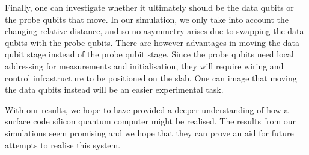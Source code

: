 Finally, one can investigate whether it ultimately should be the data qubits or the probe qubits that  move. In our simulation, we only take into account the changing relative distance, and so no asymmetry arises due to swapping the data qubits with the probe qubits. There are however advantages in moving the data qubit stage instead of the probe qubit stage. Since the probe qubits need local addressing for measurements and initialisation, they will require wiring and control infrastructure to be positioned on the slab. One can image that moving the data qubits instead will be an easier experimental task. 

With our results, we hope to have provided a deeper understanding of how a surface code silicon quantum computer might be realised. The results from our simulations seem promising and we hope that they can prove an aid for future attempts to realise this system. 













